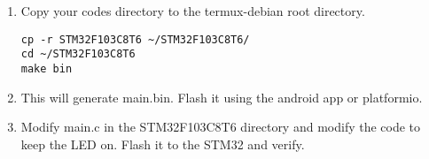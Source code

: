 \begin{enumerate}[label=\arabic*.,ref=\theenumi]
	\item Copy your codes directory to the termux-debian root directory.
		\begin{lstlisting}
cp -r STM32F103C8T6 ~/STM32F103C8T6/
cd ~/STM32F103C8T6 
make bin
\end{lstlisting}
\item This will generate main.bin.  Flash it using the android app or platformio.
\item Modify main.c in the STM32F103C8T6 directory and modify the code to keep the LED on. Flash it to the STM32 and verify.
\end{enumerate}


